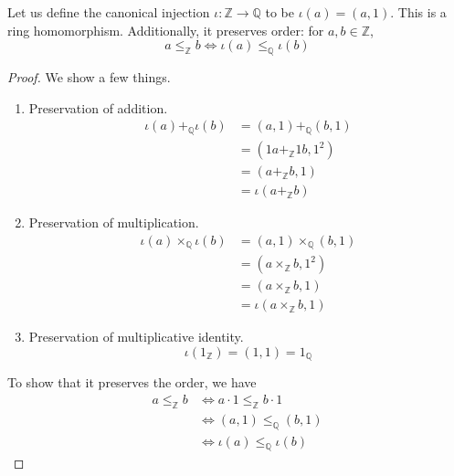   \begin{theorem}
    Let us define the canonical injection $\iota: \mathbb{Z} \rightarrow \mathbb{Q}$ to be $\iota(a) = (a, 1)$. This is a ring homomorphism. Additionally, it preserves order: for $a, b \in \mathbb{Z}$, 
    \begin{equation}
      a \leq_{\mathbb{Z}} b \iff \iota(a) \leq_{\mathbb{Q}} \iota(b)
    \end{equation}
  \end{theorem}
  \begin{proof} 
    We show a few things. 
    \begin{enumerate}
      \item Preservation of addition. 
        \begin{align}
          \iota(a) +_{\mathbb{Q}} \iota(b) & = (a, 1) +_{\mathbb{Q}} (b, 1) \\
                                           & = (1a +_{\mathbb{Z}} 1b, 1^2) \\
                                           & = (a +_{\mathbb{Z}} b, 1) \\
                                           & = \iota(a +_{\mathbb{Z}} b) 
        \end{align}
      \item Preservation of multiplication. 
        \begin{align}
          \iota(a) \times_{\mathbb{Q}} \iota(b) & = (a, 1) \times_{\mathbb{Q}} (b, 1) \\
                                                & = (a \times_{\mathbb{Z}} b, 1^2) \\
                                                & = (a \times_{\mathbb{Z}} b, 1) \\
                                                & = \iota(a \times_{\mathbb{Z}} b, 1)
        \end{align}
      \item Preservation of multiplicative identity. 
        \begin{equation}
          \iota(1_{\mathbb{Z}}) = (1, 1) = 1_{\mathbb{Q}}
        \end{equation}
    \end{enumerate}
    To show that it preserves the order, we have 
    \begin{align}
      a \leq_{\mathbb{Z}} b & \iff a \cdot 1 \leq_{\mathbb{Z}} b \cdot 1 \\
                            & \iff (a, 1) \leq_{\mathbb{Q}} (b, 1) \\
                            & \iff \iota(a) \leq_{\mathbb{Q}} \iota(b)
    \end{align}
  \end{proof} 

